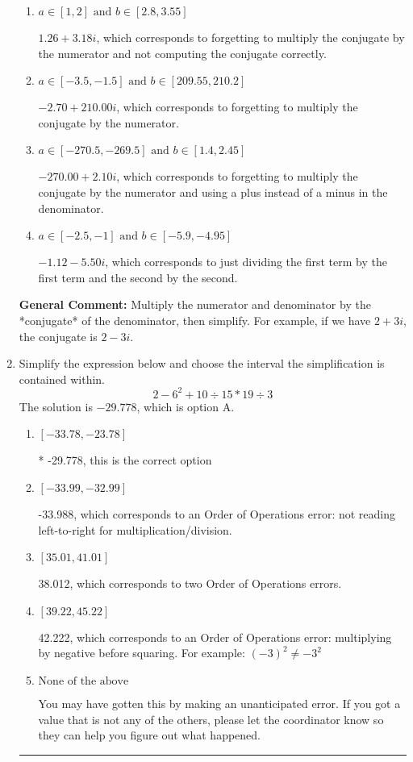 \documentclass{extbook}[14pt]
\newcommand{\litem}[1]{\item #1

\rule{\textwidth}{0.4pt}}
\begin{document}
\begin{enumerate}
{\begin{enumerate}[label=\Alph*.]
* $-2.70  + 2.10 i$, which is the correct option.
\item \( a \in [1, 2] \text{ and } b \in [2.8, 3.55] \)

 $1.26  + 3.18 i$, which corresponds to forgetting to multiply the conjugate by the numerator and not computing the conjugate correctly.
\item \( a \in [-3.5, -1.5] \text{ and } b \in [209.55, 210.2] \)

 $-2.70  + 210.00 i$, which corresponds to forgetting to multiply the conjugate by the numerator.
\item \( a \in [-270.5, -269.5] \text{ and } b \in [1.4, 2.45] \)

 $-270.00  + 2.10 i$, which corresponds to forgetting to multiply the conjugate by the numerator and using a plus instead of a minus in the denominator.
\item \( a \in [-2.5, -1] \text{ and } b \in [-5.9, -4.95] \)

 $-1.12  - 5.50 i$, which corresponds to just dividing the first term by the first term and the second by the second.
\end{enumerate}

\textbf{General Comment:} Multiply the numerator and denominator by the *conjugate* of the denominator, then simplify. For example, if we have $2+3i$, the conjugate is $2-3i$.
}
\litem{
Simplify the expression below and choose the interval the simplification is contained within.
\[ 2 - 6^2 + 10 \div 15 * 19 \div 3 \]The solution is \( -29.778 \), which is option A.\begin{enumerate}[label=\Alph*.]
\item \( [-33.78, -23.78] \)

* -29.778, this is the correct option
\item \( [-33.99, -32.99] \)

 -33.988, which corresponds to an Order of Operations error: not reading left-to-right for multiplication/division.
\item \( [35.01, 41.01] \)

 38.012, which corresponds to two Order of Operations errors.
\item \( [39.22, 45.22] \)

 42.222, which corresponds to an Order of Operations error: multiplying by negative before squaring. For example: $(-3)^2 \neq -3^2$
\item \( \text{None of the above} \)

 You may have gotten this by making an unanticipated error. If you got a value that is not any of the others, please let the coordinator know so they can help you figure out what happened.
\end{enumerate}

}
\end{enumerate}
\end{document}
